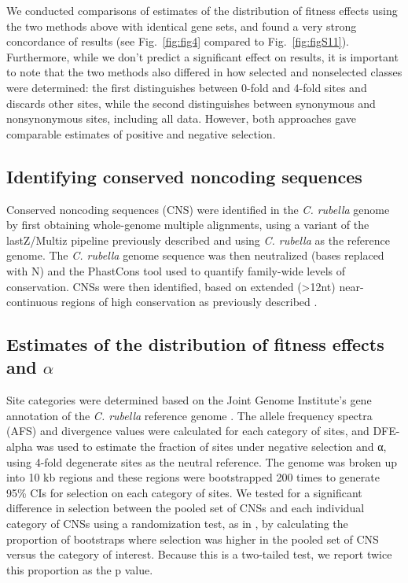 We conducted comparisons of estimates of the distribution of fitness effects using the two methods above with identical gene sets, and found a very strong concordance of results (see Fig.~\ref{fig:fig4} compared to Fig.~\ref{fig:figS11}). Furthermore, while we don't predict a significant effect on results, it is important to note that the two methods also differed in how selected and nonselected classes were determined: the first distinguishes between 0-fold and 4-fold sites and discards other sites, while the second distinguishes between synonymous and nonsynonymous sites, including all data. However, both approaches gave comparable estimates of positive and negative selection.

\subsection{Identifying conserved noncoding sequences}
Conserved noncoding sequences (CNS) were identified in the \textit{C. rubella} genome by first obtaining whole-genome multiple alignments, using a variant of the lastZ/Multiz pipeline previously described \citep{Haudry2013-qe,blanchette2004} and using \textit{C. rubella} as the reference genome. The \textit{C. rubella} genome sequence was then neutralized (bases replaced with N) and the PhastCons tool used to quantify family-wide levels of conservation. CNSs were then identified, based on extended (>12nt) near-continuous regions of high conservation as previously described \citep{Haudry2013-qe}.

\subsection{Estimates of the distribution of fitness effects and $\alpha$}
Site categories were determined based on the Joint Genome Institute’s gene annotation of the \textit{C. rubella} reference genome \citep{Slotte2013-py}. The allele frequency spectra (AFS) and divergence values were calculated for each category of sites, and DFE-alpha \citep{keightley2007,Eyre-Walker2009-zt} was used to estimate the fraction of sites under negative selection and α, using 4-fold degenerate sites as the neutral reference. The genome was broken up into 10 kb regions and these regions were bootstrapped 200 times to generate 95\% CIs for selection on each category of sites. We tested for a significant difference in selection between the pooled set of CNSs and each individual category of CNSs using a randomization test, as in \citet{Eyre-Walker2009-zt}, by calculating the proportion of bootstraps where selection was higher in the pooled set of CNS versus the category of interest. Because this is a two-tailed test, we report twice this proportion as the p value. 

